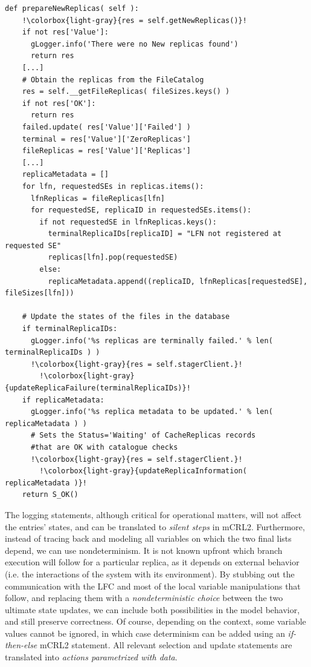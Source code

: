 \documentclass[sort&compress,preprint,3p]{elsarticle}
\begin{document}
\begin{lstlisting}[label=listing2,escapechar=!,basicstyle=\ttfamily\fontsize{8}{7}\ \selectfont]
  def prepareNewReplicas( self ):
    !\colorbox{light-gray}{res = self.getNewReplicas()}!
    if not res['Value']:
      gLogger.info('There were no New replicas found')
      return res
    [...]
    # Obtain the replicas from the FileCatalog
    res = self.__getFileReplicas( fileSizes.keys() )
    if not res['OK']:
      return res
    failed.update( res['Value']['Failed'] )
    terminal = res['Value']['ZeroReplicas']
    fileReplicas = res['Value']['Replicas']
    [...]
    replicaMetadata = []
    for lfn, requestedSEs in replicas.items():
      lfnReplicas = fileReplicas[lfn]
      for requestedSE, replicaID in requestedSEs.items():
        if not requestedSE in lfnReplicas.keys():
          terminalReplicaIDs[replicaID] = "LFN not registered at requested SE"
          replicas[lfn].pop(requestedSE)
        else:
          replicaMetadata.append((replicaID, lfnReplicas[requestedSE], fileSizes[lfn]))

    # Update the states of the files in the database
    if terminalReplicaIDs:
      gLogger.info('%s replicas are terminally failed.' % len( terminalReplicaIDs ) )
      !\colorbox{light-gray}{res = self.stagerClient.}!
	    !\colorbox{light-gray}{updateReplicaFailure(terminalReplicaIDs)}!
    if replicaMetadata:
      gLogger.info('%s replica metadata to be updated.' % len( replicaMetadata ) )
      # Sets the Status='Waiting' of CacheReplicas records 
      #that are OK with catalogue checks
      !\colorbox{light-gray}{res = self.stagerClient.}!
	    !\colorbox{light-gray}{updateReplicaInformation( replicaMetadata )}!
    return S_OK()   
\end{lstlisting}
The logging statements, although critical for operational matters, will
not affect the entries' states, and can be translated to \textit{silent steps} in mCRL2.
Furthermore, instead of tracing back and modeling all variables on which 
the two final lists depend, we can use nondeterminism. 
It is not known upfront which branch execution will follow
for a particular replica, as it depends on external behavior (i.e. the interactions of the system with its environment).
By stubbing out the communication with the LFC and
most of the local variable manipulations 
that follow, and replacing them with a \textit{nondeterministic choice} between the two
ultimate state updates, we can include both possibilities in the model behavior,
and still preserve correctness. Of course, depending on the context, some 
variable values cannot be ignored, in which case determinism can be added
using an \textit{if-then-else} mCRL2 statement. All relevant selection and update 
statements are translated into \textit{actions parametrized with data}.
\end{document}
